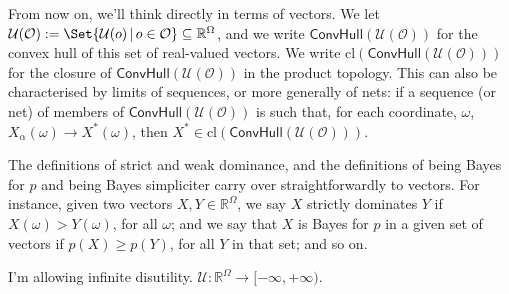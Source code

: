 \documentclass[a4paper]{article}
\newtheorem{definition}{Definition}
\newcommand\cl{\mathrm{cl}}
\renewcommand\O{\mathcal{O}}
\newcommand\Uwald{\mathcal{U}} %
\renewcommand{\Re}{\mathbb{R}}
\newcommand{\Conv}{\mathsf{ConvHull}}
\newcommand\SetDelimiter[1][]{
	\nonscript\,#1\vert \allowbreak \nonscript\,\mathopen{}}
\providecommand\given{\SetDelimiter}
\renewcommand{\geq}{\geqslant}
\newenvironment{CCM rewritten}
{\begingroup\color{blue}} %
{\endgroup}              %
\begin{document}
	From now on, we'll think directly in terms of vectors. We let $\Uwald(\O) := \Set{\Uwald(o)\given o\in \O}\subseteq\Re^\Omega$, and we write $\Conv(\Uwald(\O))$ for the convex hull of this set of real-valued vectors. We write $\cl(\Conv(\Uwald(\O)))$ for the closure of $\Conv(\Uwald(\O))$ in the product topology. This can also be characterised by limits of sequences, or more generally of nets: if a sequence (or net) of members of $\Conv(\Uwald(\O))$ is such that, for each coordinate, $\omega$, $X_\alpha(\omega)\longrightarrow X^*(\omega)$, then $X^*\in\cl(\Conv(\Uwald(\O)))$. 
	
	
	The definitions of strict and weak dominance, and the definitions of being Bayes for $p$ and being Bayes simpliciter carry over straightforwardly to vectors. For instance, given two vectors $X, Y \in \Re^\Omega$, we say $X$ strictly dominates $Y$ if $X(\omega) > Y(\omega)$, for all $\omega$; and we say that $X$ is Bayes for $p$ in a given set of vectors if $p(X) \geq p(Y)$, for all $Y$ in that set; and so on.
	
	\begin{infversion}
		I'm allowing infinite disutility. $\Uwald:\Re^\Omega\to[-\infty,+\infty)$. 
	\end{infversion}
	
\end{document}
